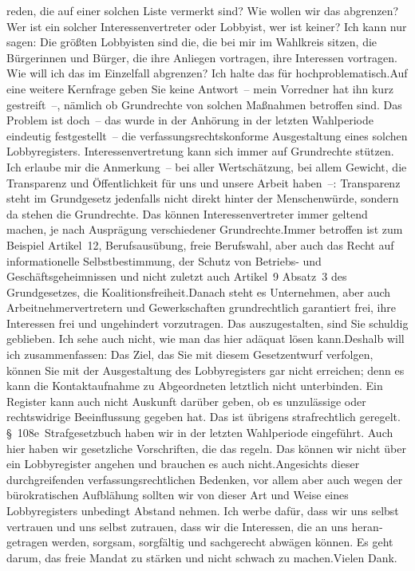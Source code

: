 \documentclass{article}
\begin{document}
reden, die auf einer solchen Liste vermerkt sind? Wie wollen wir das abgrenzen? Wer ist ein solcher Interessenvertreter oder Lobbyist, wer ist keiner? Ich kann nur sagen: Die größten Lobbyisten sind die, die bei mir im Wahlkreis sitzen, die Bürgerinnen und Bürger, die ihre Anliegen vortragen, ihre Interessen vortragen. Wie will ich das im Einzelfall abgrenzen? Ich halte das für hochproblematisch.Auf eine weitere Kernfrage geben Sie keine Antwort – mein Vorredner hat ihn kurz gestreift –, nämlich ob Grundrechte von solchen Maßnahmen betroffen sind. Das Problem ist doch – das wurde in der Anhörung in der letzten Wahlperiode eindeutig festgestellt – die verfassungsrechtskonforme Ausgestaltung eines solchen Lobbyregisters. Interessenvertretung kann sich immer auf Grundrechte stützen. Ich erlaube mir die Anmerkung – bei aller Wertschätzung, bei allem Gewicht, die Transparenz und Öffentlichkeit für uns und unsere Arbeit haben –: Transparenz steht im Grundgesetz jedenfalls nicht direkt hinter der Menschenwürde, sondern da stehen die Grundrechte. Das können Interessenvertreter immer geltend machen, je nach Ausprägung verschiedener Grundrechte.Immer betroffen ist zum Beispiel Artikel 12, Berufsausübung, freie Berufswahl, aber auch das Recht auf informationelle Selbstbestimmung, der Schutz von Betriebs- und Geschäftsgeheimnissen und nicht zuletzt auch Artikel 9 Absatz 3 des Grundgesetzes, die Koalitionsfreiheit.Danach steht es Unternehmen, aber auch Arbeitnehmervertretern und Gewerkschaften grundrechtlich garantiert frei, ihre Interessen frei und ungehindert vorzutragen. Das auszugestalten, sind Sie schuldig geblieben. Ich sehe auch nicht, wie man das hier adäquat lösen kann.Deshalb will ich zusammenfassen: Das Ziel, das Sie mit diesem Gesetzentwurf verfolgen, können Sie mit der Ausgestaltung des Lobbyregisters gar nicht erreichen; denn es kann die Kontaktaufnahme zu Abgeordneten letztlich nicht unterbinden. Ein Register kann auch nicht Auskunft darüber geben, ob es unzulässige oder rechtswidrige Beeinflussung gegeben hat. Das ist übrigens strafrechtlich geregelt. § 108e Strafgesetzbuch haben wir in der letzten Wahlperiode eingeführt. Auch hier haben wir gesetzliche Vorschriften, die das regeln. Das können wir nicht über ein Lobbyregister angehen und brauchen es auch nicht.Angesichts dieser durchgreifenden verfassungsrechtlichen Bedenken, vor allem aber auch wegen der bürokratischen Aufblähung sollten wir von dieser Art und Weise eines Lobbyregisters unbedingt Abstand nehmen. Ich werbe dafür, dass wir uns selbst vertrauen und uns selbst zutrauen, dass wir die Interessen, die an uns heran­getragen werden, sorgsam, sorgfältig und sachgerecht abwägen können. Es geht darum, das freie Mandat zu stärken und nicht schwach zu machen.Vielen Dank.
\end{document}
